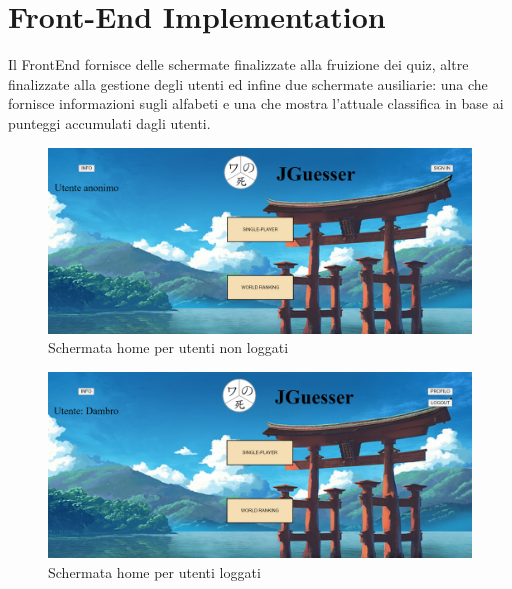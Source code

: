 \section{Front-End Implementation}
Il FrontEnd fornisce delle schermate finalizzate alla fruizione dei quiz, altre finalizzate alla gestione degli utenti ed infine due schermate ausiliarie: una che fornisce informazioni sugli alfabeti e una che mostra l’attuale classifica in base ai punteggi accumulati dagli utenti.


\begin{figure}[!h]
\centering
\includegraphics[scale=0.40]{images/homeUnlogged.png}
\caption{Schermata home per utenti non loggati}
\label{fig:user_flow_guest}
\end{figure}
\noindent


\begin{figure}[!h]
\centering
\includegraphics[scale=0.40]{images/homeLogged.png}
\caption{Schermata home per utenti loggati}
\label{fig:user_flow_guest}
\end{figure}
\noindent

